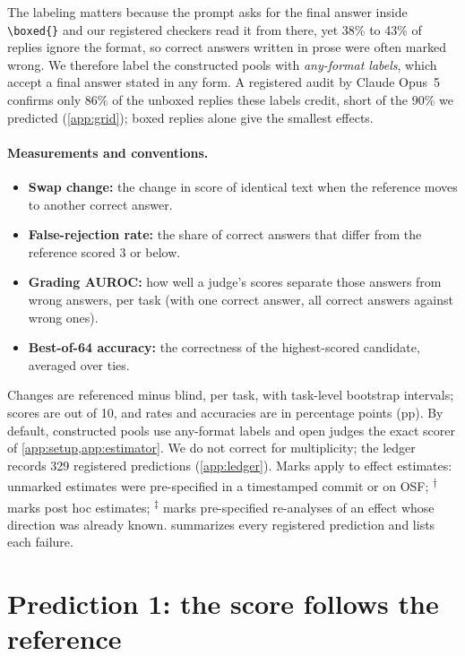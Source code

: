 \documentclass{article}
\newcommand{\reana}{\textsuperscript{$\ddagger$}}
\newcommand{\ph}{\textsuperscript{$\dagger$}}
\begin{document}
The labeling matters because the prompt asks for the final answer inside \texttt{\textbackslash boxed\{\}} and our registered checkers read it from there, yet 38\% to 43\% of replies ignore the format, so correct answers written in prose were often marked wrong.
We therefore label the constructed pools with \emph{any-format labels}, which accept a final answer stated in any form.
A registered audit by Claude Opus~5 confirms only 86\% of the unboxed replies these labels credit, short of the 90\% we predicted (\cref{app:grid}); boxed replies alone give the smallest effects.

\paragraph{Measurements and conventions.}
\begin{itemize}[leftmargin=1.2em,itemsep=0pt,topsep=0pt]
\item \textbf{Swap change:} the change in score of identical text when the reference moves to another correct answer.
\item \textbf{False-rejection rate:} the share of correct answers that differ from the reference scored 3 or below.
\item \textbf{Grading AUROC:} how well a judge's scores separate those answers from wrong answers, per task (with one correct answer, all correct answers against wrong ones).
\item \textbf{Best-of-64 accuracy:} the correctness of the highest-scored candidate, averaged over ties.
\end{itemize}
Changes are referenced minus blind, per task, with task-level bootstrap intervals; scores are out of 10, and rates and accuracies are in percentage points (pp). By default, constructed pools use any-format labels and open judges the exact scorer of \cref{app:setup,app:estimator}. We do not correct for multiplicity; the ledger records 329 registered predictions (\cref{app:ledger}).
Marks apply to effect estimates: unmarked estimates were pre-specified in a timestamped commit or on OSF; \ph{} marks post hoc estimates; \reana{} marks pre-specified re-analyses of an effect whose direction was already known.  summarizes every registered prediction and lists each failure.

\section{Prediction 1: the score follows the reference}
\label{sec:p1}
\end{document}
